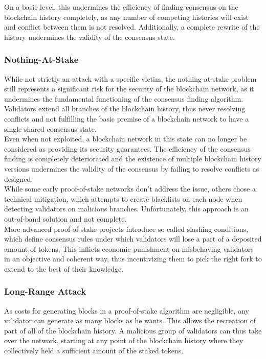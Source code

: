 \documentclass[11pt,a4paper,draft]{article}
\begin{document}
On a basic level, this undermines the efficiency of finding consensus on the blockchain history completely, as any number of competing histories will exist and conflict between them is not resolved. Additionally, a complete rewrite of the history undermines the validity of the consensus state.\\

\subsubsection{Nothing-At-Stake}

While not strictly an attack with a specific victim, the nothing-at-stake problem still represents a significant risk for the security of the blockchain network, as it undermines the fundamental functioning of the consensus finding algorithm. Validators extend all branches of the blockchain history, thus never resolving conflicts and not fulfilling the basic premise of a blockchain network to have a single shared consensus state.\\

Even when not exploited, a blockchain network in this state can no longer be considered as providing its security guarantees. The efficiency of the consensus finding is completely deteriorated and the existence of multiple blockchain history versions undermines the validity of the consensus by failing to resolve conflicts as designed.\\

While some early proof-of-stake networks don't address the issue, others chose a technical mitigation, which attempts to create blacklists on each node when detecting validators on malicious branches. Unfortunately, this approach is an out-of-band solution and not complete.\\

More advanced proof-of-stake projects introduce so-called slashing conditions,  which define consensus rules under which validators will lose a part of a deposited amount of tokens. This inflicts economic punishment on misbehaving validators in an objective and coherent way, thus incentivizing them to pick the right fork to extend to the best of their knowledge.\\

\subsubsection{Long-Range Attack}

As costs for generating blocks in a proof-of-stake algorithm are negligible, any validator can generate as many blocks as he wants. This allows the recreation of part of all of the blockchain history. A malicious group of validators can thus take over the network, starting at any point of the blockchain history where they collectively held a sufficient amount of the staked tokens.\\
\end{document}
